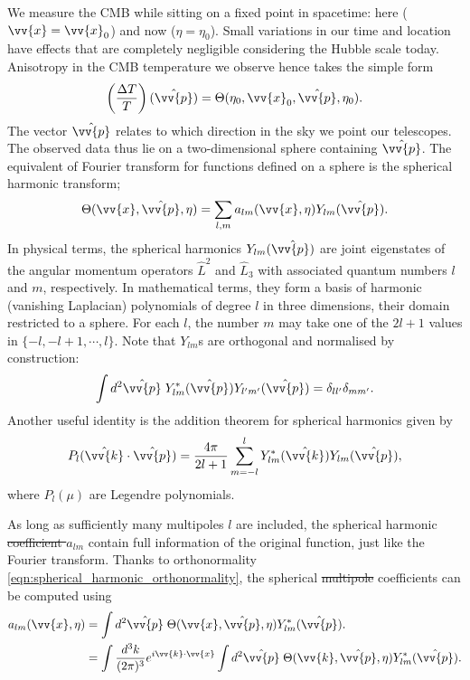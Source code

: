 \documentclass[a4paper,12pt,times,custombib,print,index]{Classes/PhDThesisPSnPDF} %
\providecommand{\DIFadd}[1]{{\protect\color{blue}\uwave{#1}}} %
\providecommand{\DIFdel}[1]{{\protect\color{red}\sout{#1}}}                      %
\providecommand{\DIFaddbegin}{} %
\providecommand{\DIFaddend}{} %
\providecommand{\DIFdelbegin}{} %
\providecommand{\DIFdelend}{} %
\newcommand{\DIFscaledelfig}{0.5}
\newlength{\DIFdelgraphicswidth} %
\newlength{\DIFdelgraphicsheight} %
\newcommand{\DIFaddincludegraphics}[2][]{{\color{blue}\fbox{\DIFOincludegraphics[#1]{#2}}}} %
\newcommand{\DIFdelincludegraphics}[2][]{%
\sbox{\DIFdelgraphicsbox}{\DIFOincludegraphics[#1]{#2}}%
\settoboxwidth{\DIFdelgraphicswidth}{\DIFdelgraphicsbox} %
\settoboxtotalheight{\DIFdelgraphicsheight}{\DIFdelgraphicsbox} %
\scalebox{\DIFscaledelfig}{%
\parbox[b]{\DIFdelgraphicswidth}{\usebox{\DIFdelgraphicsbox}\\[-\baselineskip] \rule{\DIFdelgraphicswidth}{0em}}\llap{\resizebox{\DIFdelgraphicswidth}{\DIFdelgraphicsheight}{%
\setlength{\unitlength}{\DIFdelgraphicswidth}%
\begin{picture}(1,1)%
\thicklines\linethickness{2pt} %
{\color[rgb]{1,0,0}\put(0,0){\framebox(1,1){}}}%
{\color[rgb]{1,0,0}\put(0,0){\line( 1,1){1}}}%
{\color[rgb]{1,0,0}\put(0,1){\line(1,-1){1}}}%
\end{picture}%
}\hspace*{3pt}}} %
} %
\DeclareRobustCommand{\DIFaddbegin}{\DIFOaddbegin \let\includegraphics\DIFaddincludegraphics} %
\DeclareRobustCommand{\DIFaddend}{\DIFOaddend \let\includegraphics\DIFOincludegraphics} %
\DeclareRobustCommand{\DIFdelbegin}{\DIFOdelbegin \let\includegraphics\DIFdelincludegraphics} %
\DeclareRobustCommand{\DIFdelend}{\DIFOaddend \let\includegraphics\DIFOincludegraphics} %
\begin{document}
We measure the CMB while sitting on a fixed point in spacetime: here ($\vv{x}=\vv{x}_0$) and now ($\eta=\eta_0$). Small variations in our time and location have effects that are completely negligible considering the Hubble scale today. Anisotropy in the CMB temperature we observe hence takes the simple form
\begin{align}
	\left( \frac{\Delta T}{T} \right) (\hat{\vv{p}}) = \Theta(\eta_0, \vv{x}_0, \hat{\vv{p}}, \eta_0).
\end{align}
The vector $\hat{\vv{p}}$ relates to which direction in the sky we point our telescopes. The observed data thus lie on a two-dimensional sphere containing $\hat{\vv{p}}$. The equivalent of Fourier transform for functions defined on a sphere is the spherical harmonic transform;
\begin{align}
	\Theta(\vv{x}, \hat{\vv{p}}, \eta) = \sum_{l,m} a_{lm}(\vv{x},\eta) Y_{lm}(\hat{\vv{p}}). 
\end{align} 
In physical terms, the spherical harmonics $Y_{lm}(\hat{\vv{p})}$ are joint eigenstates of the angular momentum operators $\hat{L}^2$ and $\hat{L}_3$ with associated quantum numbers $l$ and $m$, respectively. In mathematical terms, they form a basis of harmonic (vanishing Laplacian) polynomials of degree $l$ in three dimensions, their domain restricted to a sphere. For each $l$, the number $m$ may take one of the $2l+1$ values in $\{-l,-l+1,\cdots,l\}$. Note that $Y_{lm}$s are orthogonal and normalised by construction:
\begin{align}
	\int d^2\hat{\vv{p}} \; Y^*_{lm} (\hat{\vv{p}}) Y_{l'm'} (\hat{\vv{p}}) = \delta_{ll'} \delta_{mm'}. \label{eqn:spherical_harmonic_orthonormality}
\end{align}
Another useful identity is the addition theorem for spherical harmonics given by
\begin{align}
	P_l (\hat{\vv{k}} \cdot \hat{\vv{p}}) = \frac{4\pi}{2l+1} \sum_{m=-l}^{l} Y^*_{lm} (\hat{\vv{k}}) Y_{lm} (\hat{\vv{p}}), \label{eqn:harmonic_addition_theorem}
\end{align}
where $P_l(\mu)$ are Legendre polynomials.

As long as sufficiently many multipoles $l$ are included, the spherical harmonic \DIFdelbegin \DIFdel{coefficient $a_{lm}$ }\DIFdelend \DIFaddbegin \DIFadd{coefficients }\DIFaddend contain full information of the original function, just like the Fourier transform. Thanks to \DIFaddbegin \DIFadd{their }\DIFaddend orthonormality \eqref{eqn:spherical_harmonic_orthonormality}, the spherical \DIFdelbegin \DIFdel{multipole }\DIFdelend \DIFaddbegin \DIFadd{harmonic }\DIFaddend coefficients can be computed using
\begin{align}
	a_{lm} (\vv{x},\eta) &= \int d^2\hat{\vv{p}} \; \Theta(\vv{x}, \hat{\vv{p}},\eta) Y^*_{lm} (\hat{\vv{p}}). \\
	&= \int \frac{d^3 k}{(2\pi)^3} e^{i\vv{k}\cdot\vv{x}} \int d^2\hat{\vv{p}} \; \Theta(\vv{k},\hat{\vv{p}},\eta) Y^*_{lm}(\hat{\vv{p}}). \label{eqn:alm_derivation_alm_using_theta}
\end{align}
\end{document}

